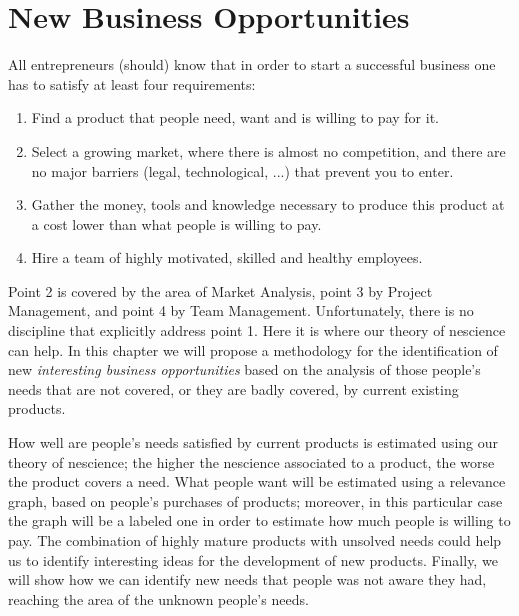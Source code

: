 %
%

%


\chapter{New Business Opportunities}
\label{chap:business-opportunities}

All entrepreneurs (should) know that in order to start a successful business one has to satisfy at least four requirements:

\bigskip

\begin{enumerate}
\item Find a product that people need, want and is willing to pay for it.
\item Select a growing market, where there is almost no competition, and there are no major barriers (legal, technological, ...) that prevent you to enter.
\item Gather the money, tools and knowledge necessary to produce this product at a cost lower than what people is willing to pay.
\item Hire a team of highly motivated, skilled and healthy employees.
\end{enumerate}

\bigskip

Point 2 is covered by the area of Market Analysis, point 3 by Project Management, and point 4 by Team Management. Unfortunately, there is no discipline that explicitly address point 1. Here it is where our theory of nescience can help. In this chapter we will propose a methodology for the identification of new \emph{interesting business opportunities} based on the analysis of those people's needs that are not covered, or they are badly covered, by current existing products. 

How well are people's needs satisfied by current products is estimated using our theory of nescience; the higher the nescience associated to a product, the worse the product covers a need. What people want will be estimated using a relevance graph, based on people's purchases of products; moreover, in this particular case the graph will be a labeled one in order to estimate how much people is willing to pay. The combination of highly mature products with unsolved needs could help us to identify interesting ideas for the development of new products. Finally, we will show how we can identify new needs that people was not aware they had, reaching the area of the unknown people's needs.

